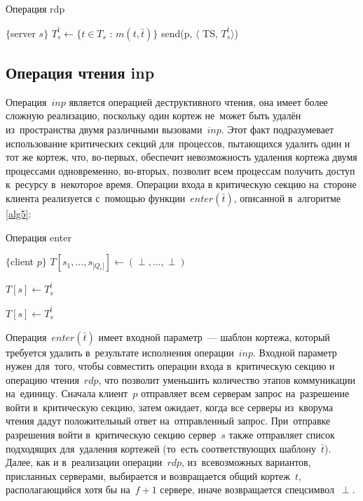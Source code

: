 \begin{algorithm}[H]
	\caption{Операция rdp}\label{alg4}
	\begin{algorithmic}[1]
		\Statex $\{$server $s \}$
		\State $T_s^{\bar t} \gets \{t \in T_s$ : $m(t, \bar t)\}$
		\State send(p, $\langle$ TS, $T_s^{\bar t}\rangle$)
		\EndUpon
	\end{algorithmic}
\end{algorithm}

\subsection{Операция чтения inp}\label{subsec5:3}
Операция~$inp$ является операцией деструктивного чтения, она имеет более сложную реализацию, поскольку один кортеж не~может быть удалён из~пространства двумя различными вызовами~$inp$. Этот факт подразумевает использование критических секций для~процессов, пытающихся удалить один и тот же кортеж, что, во-первых, обеспечит невозможность удаления кортежа двумя процессами одновременно, во-вторых, позволит всем процессам получить доступ к~ресурсу в~некоторое время. Операции входа в критическую секцию на~стороне клиента реализуется с~помощью функции~$enter(\bar t)$, описанной в~алгоритме\,\ref{alg5}:

\begin{algorithm}[H]
	\caption{Операция enter}\label{alg5}
	\begin{algorithmic}[1]
		\Statex $\{$client $p \}$
		\State $T[s_1, \dots, s_{|Q_r|}] \gets (\perp, \dots, \perp)$
		
		\State {}
		\State $T[s] \gets T_s^{\bar t}$
		\EndFor
		
		\State {}
		\State $T[s] \gets T_s^{\bar t}$
		\EndFor
		
		\State {}
		\EndIf
		\State \Return{$\perp$}
		\EndFunction
	\end{algorithmic}
\end{algorithm}

Операция~$enter(\bar t)$ имеет входной параметр~--- шаблон кортежа, который требуется удалить в~результате исполнения операции~$inp$. Входной параметр нужен для~того, чтобы совместить операции входа в~критическую секцию и операцию чтения~$rdp$, что позволит уменьшить количество этапов коммуникации на~единицу. Сначала клиент~$p$ отправляет всем серверам запрос на~разрешение войти в~критическую секцию, затем ожидает, когда все серверы из~кворума чтения дадут положительный ответ на~отправленный запрос. При~отправке разрешения войти в~критическую секцию сервер~$s$ также отправляет список подходящих для~удаления кортежей (то~есть соответствующих шаблону~$\bar t$). Далее, как и в~реализации операции~$rdp$, из~всевозможных вариантов, присланных серверами, выбирается и возвращается общий кортеж~$t$, располагающийся хотя бы на~$f + 1$ сервере, иначе возвращается спецсимвол~$\perp$.

